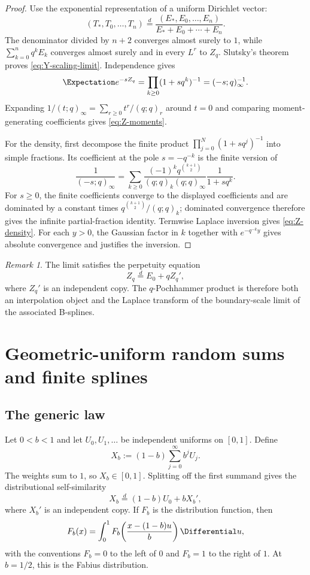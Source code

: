 \documentclass[11pt,oneside]{article}
\numberwithin{equation}{section}
\theoremstyle{definition}
\theoremstyle{remark}
\newtheorem{remark}[remark]{Remark}
\begin{document}
\begin{proof}
Use the exponential representation of a uniform Dirichlet vector:
\[
 (T_*,T_0,\ldots,T_n)
 \overset d=
 \frac{(E_*,E_0,\ldots,E_n)}{E_*+E_0+\cdots+E_n}.
\]
The denominator divided by $n+2$ converges almost surely to $1$, while
$\sum_{k=0}^nq^kE_k$ converges almost surely and in every $L^r$ to $Z_q$.
Slutsky's theorem proves \eqref{eq:Y-scaling-limit}.  Independence gives
\[
 \Expectation e^{-sZ_q}=\prod_{k\ge0}(1+sq^k)^{-1}=(-s;q)_\infty^{-1}.
\]
Expanding $1/(t;q)_\infty=\sum_{r\ge0}t^r/(q;q)_r$ around $t=0$ and comparing
moment-generating coefficients gives \eqref{eq:Z-moments}.

For the density, first decompose the finite product
$\prod_{j=0}^{N}(1+sq^j)^{-1}$ into simple fractions.  Its coefficient at the
pole $s=-q^{-k}$ is the finite version of
\[
 \frac1{(-s;q)_\infty}
 =\sum_{k\ge0}
 \frac{(-1)^kq^{\binom{k+1}{2}}}
 {(q;q)_k(q;q)_\infty}\frac1{1+sq^k}.
\]
For $s\ge0$, the finite coefficients converge to the displayed coefficients
and are dominated by a constant times
$q^{\binom{k+1}{2}}/(q;q)_k$; dominated convergence therefore gives the
infinite partial-fraction identity.  Termwise Laplace inversion gives
\eqref{eq:Z-density}.  For each $y>0$, the Gaussian factor in $k$ together with
$e^{-q^{-k}y}$ gives absolute convergence and justifies the inversion.
\end{proof}

\begin{remark}
The limit satisfies the perpetuity equation
\[
 Z_q\overset d=E_0+qZ_q',
\]
where $Z_q'$ is an independent copy.  The $q$-Pochhammer product is therefore
both an interpolation object and the Laplace transform of the boundary-scale
limit of the associated B-splines.
\end{remark}

\section{Geometric-uniform random sums and finite splines}
\label{sec:uniform-sums}

\subsection{The generic law}

Let $0<b<1$ and let $U_0,U_1,\ldots$ be independent uniforms on $[0,1]$.
Define
\begin{equation}
 X_b:=(1-b)\sum_{j=0}^{\infty}b^jU_j.
 \label{eq:Xb}
\end{equation}
The weights sum to $1$, so $X_b\in[0,1]$.  Splitting off the first summand gives
the distributional self-similarity
\begin{equation}
 X_b\overset d=(1-b)U_0+bX_b',
 \label{eq:Xb-selfsimilar}
\end{equation}
where $X_b'$ is an independent copy.  If $F_b$ is the distribution function,
then
\begin{equation}
 F_b(x)=\int_0^1F_b\!\left(\frac{x-(1-b)u}{b}\right)\Differential u,
 \label{eq:Fb-integral}
\end{equation}
with the conventions $F_b=0$ to the left of $0$ and $F_b=1$ to the right of
$1$.  At $b=1/2$, this is the Fabius distribution.
\end{document}
